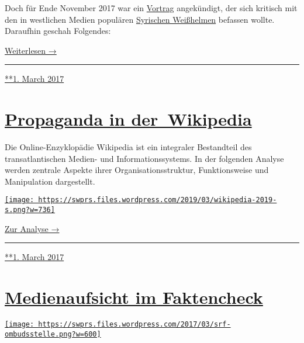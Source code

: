 Doch für Ende November 2017 war ein
\href{http://pressclub.ch/they-dont-care-about-us-white-helmets-true-agenda/?lang=en}{Vortrag}
angekündigt, der sich kritisch mit den in west­li­chen Medien populären
\href{https://www.hintergrund.de/globales/kriege/weisse-helme-ohne-weisse-westen/}{Syrischen
Weiß­helmen} befassen wollte. Daraufhin geschah Folgendes:

\href{https://swprs.org/die-grenzen-der-pressefreiheit/}{Weiterlesen →}

\begin{center}\rule{0.5\linewidth}{\linethickness}\end{center}

\href{https://swprs.org/2017/03/01/die-grenzen-der-pressefreiheit/}{**1.
March 2017}

\hypertarget{propaganda-in-der-wikipedia}{%
\section{\texorpdfstring{\href{https://swprs.org/2017/03/01/propaganda-in-der-wikipedia/}{Propaganda
in
der~Wikipedia}}{Propaganda in der~Wikipedia}}\label{propaganda-in-der-wikipedia}}

Die Online-Enzyklopädie Wikipedia ist ein integraler Bestandteil des
transatlantischen Medien- und Informationssystems. In der folgenden
Analyse werden zentrale Aspekte ihrer Organisationsstruktur,
Funktionsweise und Manipulation dargestellt.

\href{https://swprs.org/propaganda-in-der-wikipedia/}{\texttt{[image: https://swprs.files.wordpress.com/2019/03/wikipedia-2019-s.png?w=736]}}

\href{https://swprs.org/propaganda-in-der-wikipedia/}{Zur Analyse →}

\begin{center}\rule{0.5\linewidth}{\linethickness}\end{center}

\href{https://swprs.org/2017/03/01/propaganda-in-der-wikipedia/}{**1.
March 2017}

\hypertarget{medienaufsicht-im-faktencheck}{%
\section{\texorpdfstring{\href{https://swprs.org/2017/03/01/medienaufsicht-faktencheck/}{Medienaufsicht
im
Faktencheck}}{Medienaufsicht im Faktencheck}}\label{medienaufsicht-im-faktencheck}}

\href{https://swprs.org/2017/03/01/medienaufsicht-faktencheck/}{\texttt{[image: https://swprs.files.wordpress.com/2017/03/srf-ombudsstelle.png?w=600]}}


